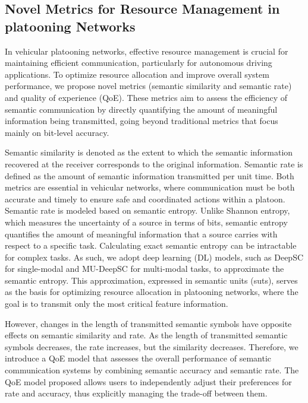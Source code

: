\documentclass[10pt, lettersize,journal]{IEEEtran}
\begin{document}
	\subsection{Novel Metrics for Resource Management in platooning Networks}
	In vehicular platooning networks, effective resource management is crucial for maintaining efficient communication, particularly for autonomous driving applications. To optimize resource allocation and improve overall system performance, we propose novel metrics (semantic similarity and semantic rate) and quality of experience (QoE). These metrics aim to assess the efficiency of semantic communication by directly quantifying the amount of meaningful information being transmitted, going beyond traditional metrics that focus mainly on bit-level accuracy.
	
	Semantic similarity is denoted as the extent to which the semantic information recovered at the receiver corresponds to the original information. Semantic rate is defined as the amount of semantic information transmitted per unit time. Both metrics are essential in vehicular networks, where communication must be both accurate and timely to ensure safe and coordinated actions within a platoon. Semantic rate is modeled based on semantic entropy. Unlike Shannon entropy, which measures the uncertainty of a source in terms of bits, semantic entropy quantifies the amount of meaningful information that a source carries with respect to a specific task. Calculating exact semantic entropy can be intractable for complex tasks. As such, we adopt deep learning (DL) models, such as DeepSC for single-modal and MU-DeepSC for multi-modal tasks, to approximate the semantic entropy\cite{10001594}. This approximation, expressed in semantic units (suts), serves as the basis for optimizing resource allocation in platooning networks, where the goal is to transmit only the most critical feature information.
	
	However, changes in the length of transmitted semantic symbols have opposite effects on semantic similarity and rate. As the length of transmitted semantic symbols decreases, the rate increases, but the similarity decreases. Therefore, we introduce a QoE model that assesses the overall performance of semantic communication systems by combining semantic accuracy and semantic rate. The QoE model proposed allows users to independently adjust their preferences for rate and accuracy, thus explicitly managing the trade-off between them.
	
\end{document}
